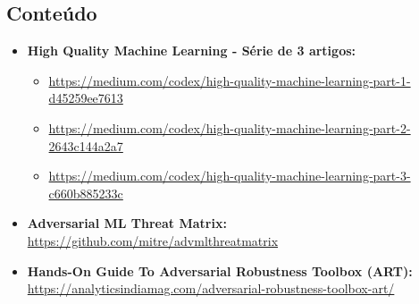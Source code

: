 \documentclass[portugues, 12pt, a4paper]{article}
\begin{document}
\subsection{Conteúdo}

\begin{itemize}
\item \textbf{High Quality Machine Learning - Série de 3 artigos:} 
	\begin{itemize}
	\item \url{https://medium.com/codex/high-quality-machine-learning-part-1-d45259ee7613}

	\item \url{https://medium.com/codex/high-quality-machine-learning-part-2-2643c144a2a7}

	\item \url{https://medium.com/codex/high-quality-machine-learning-part-3-c660b885233c}
	\end{itemize}

\item \textbf{Adversarial ML Threat Matrix:} \url{https://github.com/mitre/advmlthreatmatrix}

\item \textbf{Hands-On Guide To Adversarial Robustness Toolbox (ART):} \url{https://analyticsindiamag.com/adversarial-robustness-toolbox-art/}

\end{itemize}





\end{document}
